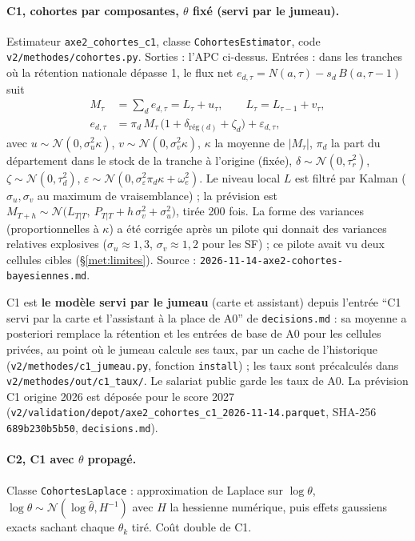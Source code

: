 \paragraph{C1, cohortes par composantes, $\theta$ fixé (servi par le jumeau).} Estimateur
\texttt{axe2\_cohortes\_c1}, classe \texttt{CohortesEstimator}, code \texttt{v2/methodes/cohortes.py}.
Sorties : l'APC ci-dessus. Entrées : dans les tranches où la rétention nationale dépasse 1, le flux net
$e_{d,\tau} = N(a,\tau) - s_d\,B(a,\tau-1)$ suit
\begin{align}
  M_\tau &= \textstyle\sum_d e_{d,\tau} = L_\tau + u_\tau, \qquad L_\tau = L_{\tau-1} + v_\tau, \\
  e_{d,\tau} &= \pi_d\, M_\tau\,\big(1 + \delta_{\text{rég}(d)} + \zeta_d\big) + \varepsilon_{d,\tau},
\end{align}
avec $u \sim \mathcal N(0,\sigma_u^2\kappa)$, $v \sim \mathcal N(0,\sigma_v^2\kappa)$, $\kappa$ la moyenne de
$|M_\tau|$, $\pi_d$ la part du département dans le stock de la tranche à l'origine (fixée),
$\delta \sim \mathcal N(0,\tau_r^2)$, $\zeta \sim \mathcal N(0,\tau_d^2)$,
$\varepsilon \sim \mathcal N(0, \sigma_\varepsilon^2\pi_d\kappa + \omega_e^2)$. Le niveau local $L$ est
filtré par Kalman ($\sigma_u, \sigma_v$ au maximum de vraisemblance) ; la prévision est
$M_{T+h} \sim \mathcal N\big(L_{T|T},\ P_{T|T} + h\,\sigma_v^2 + \sigma_u^2\big)$, tirée 200 fois. La forme
des variances (proportionnelles à $\kappa$) a été corrigée après un pilote qui donnait des variances
relatives explosives ($\sigma_u \approx 1{,}3$\mesure, $\sigma_v \approx 1{,}2$\mesure{} pour les SF) ; ce
pilote avait vu deux cellules cibles (\S\ref{met:limites}). Source :
\texttt{2026-11-14-axe2-cohortes-bayesiennes.md}.

C1 est \textbf{le modèle servi par le jumeau} (carte et assistant) depuis l'entrée \enquote{C1 servi par la
carte et l'assistant à la place de A0} de \texttt{decisions.md} : sa moyenne a posteriori remplace la
rétention et les entrées de base de A0 pour les cellules privées, au point où le jumeau calcule ses taux,
par un cache de l'historique (\texttt{v2/methodes/c1\_jumeau.py}, fonction \texttt{install}) ; les taux
sont précalculés dans \texttt{v2/methodes/out/c1\_taux/}. Le salariat public garde les taux de A0. La
prévision C1 origine 2026 est déposée pour le score 2027
(\texttt{v2/validation/depot/axe2\_cohortes\_c1\_2026-11-14.parquet}, SHA-256 \texttt{689b230b5b50},
\texttt{decisions.md}).

\paragraph{C2, C1 avec $\theta$ propagé.} Classe \texttt{CohortesLaplace} : approximation de Laplace sur
$\log\theta$, $\log\theta \sim \mathcal N(\log\hat\theta, H^{-1})$ avec $H$ la hessienne numérique, puis
effets gaussiens exacts sachant chaque $\theta_k$ tiré. Coût double\mesure{} de C1.

